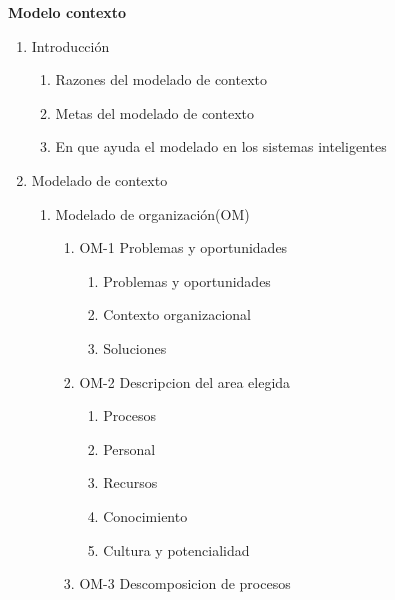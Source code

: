 \documentclass{article}
\begin{document}
\begin{center}
    {\LARGE \textbf{Modelo contexto}}
\end{center}

 \vspace{2 em}
 \hline


    \begin{enumerate}
        \item Introducción
            \begin{enumerate}
                \item Razones del modelado de contexto
                \item Metas del modelado de contexto
                \item En que ayuda el modelado en los sistemas inteligentes
            \end{enumerate}
        \item Modelado de contexto
            \begin{enumerate}
                \item Modelado de organización(OM)
                    \begin{enumerate}
                        \item OM-1 Problemas y oportunidades
                            \begin{enumerate}
                                \item Problemas y oportunidades
                                \item Contexto organizacional
                                \item Soluciones
                            \end{enumerate}
                        \item OM-2 Descripcion del area elegida
                            \begin{enumerate}
                                \item Procesos
                                \item Personal
                                \item Recursos
                                \item Conocimiento
                                \item Cultura y potencialidad
                            \end{enumerate}
                        \item OM-3 Descomposicion de procesos
                            \begin{enumerate}

\end{enumerate}
\end{enumerate}
\end{enumerate}
\end{enumerate}
\end{document}
